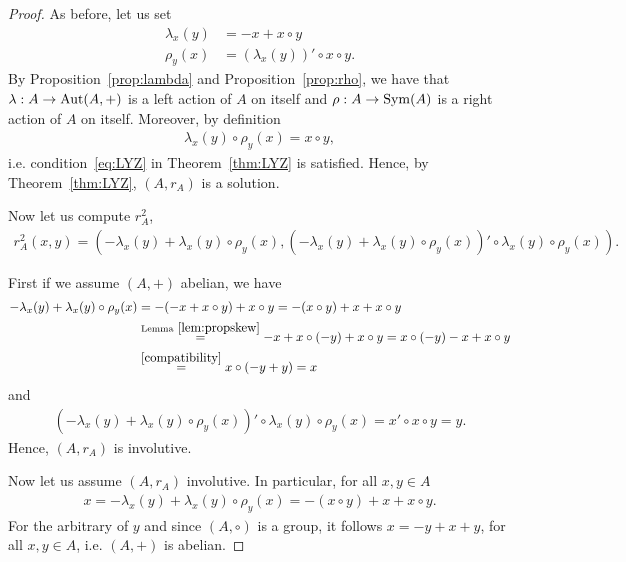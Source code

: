     \begin{proof}
        As before, let us set 
        \begin{align*}
            \lambda_x(y)&=-x+x\circ y\\
            \rho_y(x) &= (\lambda_x(y))'\circ x \circ y.
        \end{align*}
        By Proposition~\ref{prop:lambda} and Proposition~\ref{prop:rho}, we have that 
        $\lambda: A \to \operatorname{Aut}(A,+)$ is a left action of $A$ on itself and $\rho: A\to \operatorname{Sym}(A)$ is a right action of $A$ on itself. Moreover, by definition
        \begin{align*}
            \lambda_x(y)\circ\rho_y(x)=x\circ y,
        \end{align*}
        i.e. condition~\eqref{eq:LYZ} in Theorem~\ref{thm:LYZ} is satisfied. 
        Hence, by Theorem~\ref{thm:LYZ}, $(A,r_A)$ is a solution.

        Now let us compute $r_A^2$,
        \begin{align*}
            r_A^2(x,y) = (-\lambda_x(y) + \lambda_x(y)\circ \rho_y(x), (-\lambda_x(y) + \lambda_x(y)\circ \rho_y(x))'\circ \lambda_x(y)\circ \rho_y(x)).
        \end{align*}

        First if we assume $(A,+)$ abelian, we have
        \begin{align*}
            -\lambda_x(y) + \lambda_x(y)\circ \rho_y(x) &= -(-x+x\circ y) + x\circ y
            = -(x\circ y) +x +x\circ y \\
            &\overset{\text{Lemma}~\ref{lem:propskew}}{=}
            - x + x\circ (-y) +x\circ y = x\circ (-y)-x +x\circ y \\
            &\overset{\eqref{compatibility}}{=} x\circ(-y+y) = x
        \end{align*}
        and
        \begin{align*}
            (-\lambda_x(y) + \lambda_x(y)\circ \rho_y(x))'\circ \lambda_x(y)\circ \rho_y(x)
            =x' \circ x\circ y = y.
        \end{align*}
        Hence, $(A,r_A)$ is involutive.

        Now let us assume $(A,r_A)$ involutive. In particular, for all $x,y\in A$
        \begin{align*}
            x= -\lambda_x(y) + \lambda_x(y)\circ \rho_y(x) = -(x\circ y) +x +x\circ y.
        \end{align*}
        For the arbitrary of $y$ and since $(A,\circ)$ is a group, it follows
        $x=-y+x+y$, for all $x,y \in A$, i.e. $(A,+)$ is abelian.        
    \end{proof}


